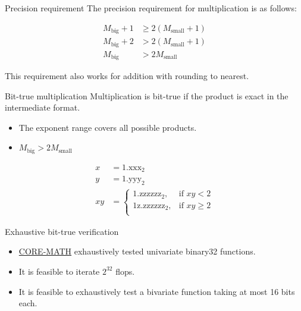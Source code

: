 \documentclass{beamer}
\begin{document}
\begin{frame}{Precision requirement}
	The precision requirement for multiplication is as follows:

	\begin{align*}
		M_{\text{big}} + 1 &\ge 2 \left( M_{\text{small}} + 1 \right) \\
		M_{\text{big}} + 2 &> 2 \left( M_{\text{small}} + 1 \right) \\
		M_{\text{big}} &> 2M_{\text{small}}
	\end{align*}

	This requirement also works for addition with rounding to nearest.
\end{frame}

\begin{frame}{Bit-true multiplication}
	Multiplication is bit-true if the product is exact in the intermediate format.
	\begin{itemize}
		\item The exponent range covers all possible products.
		\item $M_{\text{big}} > 2M_{\text{small}}$
	\end{itemize}

	\begin{example}
		\begin{align*}
			x &= 1.\text{xxx}_2 \\
			y &= 1.\text{yyy}_2 \\
			xy &=
			\begin{cases}
				1.\text{zzzzzz}_2, & \text{if } xy < 2 \\
				1\text{z}.\text{zzzzzz}_2 , & \text{if } xy \ge 2 \\
			\end{cases}
		\end{align*}
	\end{example}
\end{frame}

\begin{frame}{Exhaustive bit-true verification}
	\begin{itemize}
		\item \href{https://core-math.gitlabpages.inria.fr/}{CORE-MATH} exhaustively tested univariate binary32 functions.
		\item It is feasible to iterate $2^{32}$ flops.
		\item It is feasible to exhaustively test a bivariate function taking at most 16 bits each.
	\end{itemize}
\end{frame}
\end{document}
